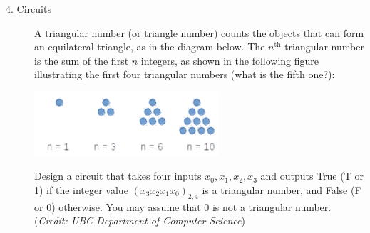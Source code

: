 \documentclass[12pt, oneside]{article}
\begin{document}
\begin{description}
\item[4. Circuits]   
A triangular number (or triangle number) counts the objects that can form an equilateral
triangle, as in the diagram below. The $n^{\text{th}}$ triangular number is the sum of the first $n$
 integers,
as shown in the following figure illustrating the first four triangular numbers (what is the
fifth one?):
\begin{center}
\includegraphics[width=2.7in]{../../resources/images/triangle.png}
\end{center}
Design a circuit that takes four inputs $x_0, x_1, x_2, x_3$ and outputs
True (T or 1) if the integer value 
$(x_3x_2x_1x_0)_{2,4} $ is a triangular number, and False (F or 0) otherwise. You may assume that 0 is
not a triangular number. ({\it Credit: UBC Department of Computer Science})


\end{description}
\end{document}
